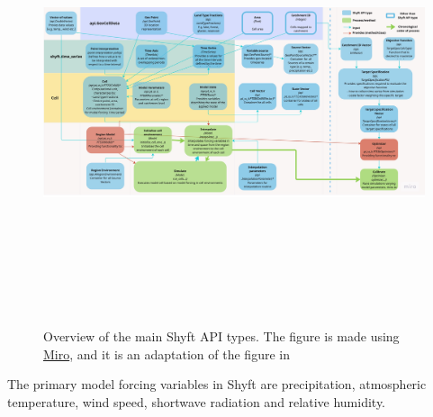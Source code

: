 \begin{figure}[ht]
    \centering
    \includegraphics[width=1.1\textwidth,height=13cm]{figures/methods/Swimlane Diagram.jpg}
    \caption{Overview of the main Shyft API types. The figure is made using \href{https://miro.com}{Miro}, and it is an adaptation of the figure in \autocite{burkhartShyftV4Framework2021}}
    \label{fig:shyft}
\end{figure}

The primary model forcing variables in Shyft are precipitation, atmospheric temperature, wind speed, shortwave radiation and relative humidity.


